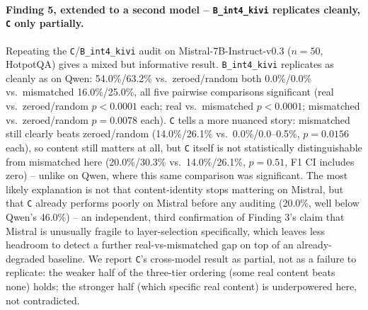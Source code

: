 \documentclass[11pt]{article}
\begin{document}
\paragraph{Finding 5, extended to a second model -- \texttt{B\_int4\_kivi}
replicates cleanly, \texttt{C} only partially.} Repeating the
\texttt{C}/\texttt{B\_int4\_kivi} audit on Mistral-7B-Instruct-v0.3
($n=50$, HotpotQA) gives a mixed but informative result.
\texttt{B\_int4\_kivi} replicates as cleanly as on Qwen: 54.0\%/63.2\%
vs.\ zeroed/random both 0.0\%/0.0\% vs.\ mismatched 16.0\%/25.0\%, all
five pairwise comparisons significant (real vs.\ zeroed/random
$p<0.0001$ each; real vs.\ mismatched $p<0.0001$; mismatched vs.\
zeroed/random $p=0.0078$ each). \texttt{C} tells a more nuanced story:
mismatched still clearly beats zeroed/random (14.0\%/26.1\% vs.\
0.0\%/0.0--0.5\%, $p=0.0156$ each), so content still matters at all, but
\texttt{C} itself is not statistically distinguishable from mismatched
here (20.0\%/30.3\% vs.\ 14.0\%/26.1\%, $p=0.51$, F1 CI includes zero) --
unlike on Qwen, where this same comparison was significant. The most
likely explanation is not that content-identity stops mattering on
Mistral, but that \texttt{C} already performs poorly on Mistral before
any auditing (20.0\%, well below Qwen's 46.0\%) -- an independent, third
confirmation of Finding 3's claim that Mistral is unusually fragile to
layer-selection specifically, which leaves less headroom to detect a
further real-vs-mismatched gap on top of an already-degraded baseline.
We report \texttt{C}'s cross-model result as partial, not as a failure
to replicate: the weaker half of the three-tier ordering (some real
content beats none) holds; the stronger half (which specific real
content) is underpowered here, not contradicted.
\end{document}
